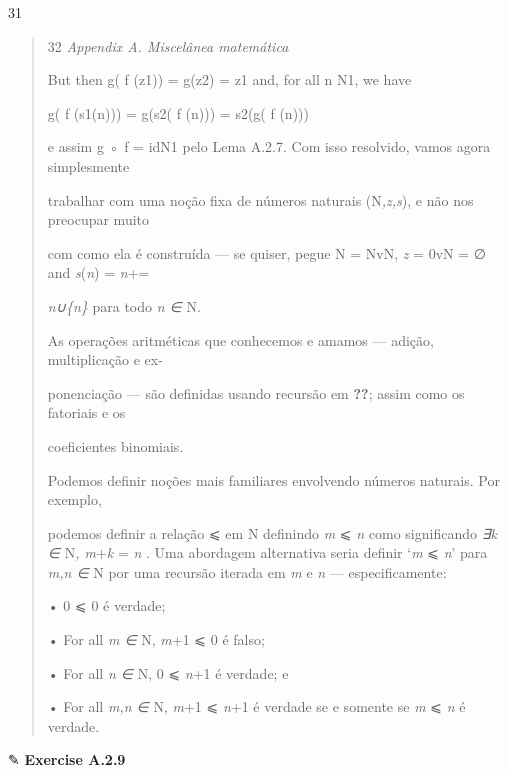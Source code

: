 \documentclass[
]{article}
\begin{document}
31

\begin{quote}
32 \emph{Appendix A. Miscelânea matemática}

But then g( f (z1)) = g(z2) = z1 and, for all n N1, we have

g( f (s1(n))) = g(s2( f (n))) = s2(g( f (n)))

e assim g ◦ f = idN1 pelo Lema A.2.7. Com isso resolvido, vamos agora
simplesmente

trabalhar com uma noção fixa de números naturais (N\emph{,z,s}), e não
nos preocupar muito

com como ela é construída --- se quiser, pegue N = NvN, \emph{z} = 0vN =
∅ and \emph{s}(\emph{n}) = \emph{n}+=

\emph{n∪\{n\}} para todo \emph{n ∈} N.

As operações aritméticas que conhecemos e amamos --- adição,
multiplicação e ex-

ponenciação --- são definidas usando recursão em \textbf{??}; assim como
os fatoriais e os

coeficientes binomiais.

Podemos definir noções mais familiares envolvendo números naturais. Por
exemplo,

podemos definir a relação ⩽ em N definindo \emph{m} ⩽ \emph{n} como
significando \emph{∃k ∈} N\emph{, m}+\emph{k} = \emph{n} . Uma abordagem
alternativa seria definir `\emph{m} ⩽ \emph{n}' para \emph{m,n ∈} N por
uma recursão iterada em \emph{m} e \emph{n} --- especificamente:

• 0 ⩽ 0 é verdade;

• For all \emph{m ∈} N, \emph{m}+1 ⩽ 0 é falso;

• For all \emph{n ∈} N, 0 ⩽ \emph{n}+1 é verdade; e

• For all \emph{m,n ∈} N, \emph{m}+1 ⩽ \emph{n}+1 é verdade se e somente
se \emph{m} ⩽ \emph{n} é verdade.
\end{quote}

✎ \textbf{Exercise A.2.9}
\end{document}
